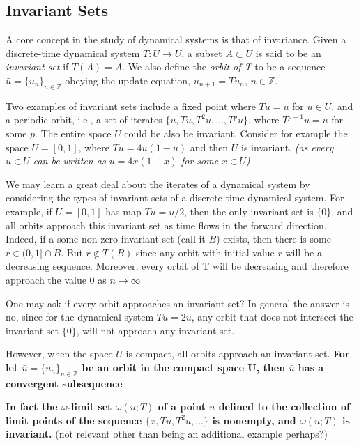 \documentclass[12 pt]{article}
\begin{document}
\subsection{Invariant Sets}

A core concept in the study of dynamical systems is that of invariance. Given a discrete-time dynamical system $T: U \to U$, a subset $A \subset U$ is said to be an \emph{invariant set} if $T(A) =A$. 
We also define the \emph{orbit of T} to be a sequence $\bar{u} = \{u_n\}_{n\in \mathbb{Z}}$ obeying the update equation, $u_{n+1}=Tu_n$, $n \in \mathbb{Z}$. 


Two examples of invariant sets include a fixed point where $Tu=u$ for  $u\in U$, and a periodic orbit, i.e., a set of iterates $\{u,Tu, T^2u,\ldots,T^pu\}$, where $T^{p+1}u=u$ for some $p$.  The entire space $U$ could be also be invariant.
Consider for example the space $U=[0,1]$, where $Tu=4u(1-u)$ and then $U$ is invariant. \emph{(as every $u\in{U}$ can be written as $u = 4x(1-x)$ for some $x\in{U}$)}

We may learn a great deal about the iterates of a dynamical system by considering the types of invariant sets of a discrete-time dynamical system.  For example, if $U=[0,1]$ has map $Tu= u/2$, then the only invariant set is $\{0\}$, and all orbits approach this invariant set as time flows in the forward direction. 
Indeed, if a some non-zero invariant set (call it $B$) exists, then there is  some $r\in(0,1]\cap{B}$. But $r\notin{T(B)}$ since any orbit with initial value $r$ will be a decreasing sequence. Moreover, every orbit of T will be decreasing and therefore approach the value $0$ as $n\rightarrow\infty$

One may ask if every orbit approaches an invariant set? In general the answer is no, since for the dynamical system $Tu=2u$, any orbit that does not intersect the invariant set $\{0\}$, will not approach any invariant set. 

However,  when the space $U$ is compact, all orbits approach an invariant set. \textbf{For let $\bar{u} = \{u_n\}_{n\in \mathbb{Z}}$ be an orbit in the compact space U, then $\bar{u}$ has a convergent subsequence }

\textbf{In fact the $\omega$-limit set $\omega(u;T)$ of a point $u$ defined to the collection of limit points of the sequence $\{x,Tu,T^2u,\ldots\}$ is nonempty, and $\omega(u;T)$ is invariant. } (not relevant other than being an additional example perhaps?)
\end{document}
